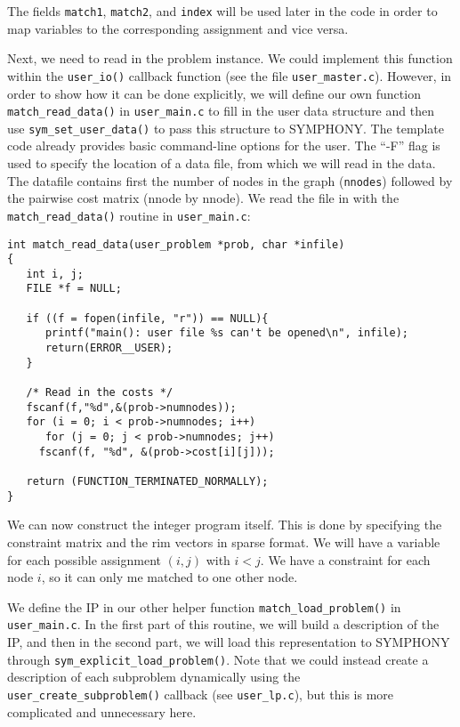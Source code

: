 \documentclass[11pt]{article}
\begin{document}
The fields \texttt{match1}, \texttt{match2}, and
\texttt{index} will be used later in the code in order to map variables to the
corresponding assignment and vice versa. 

Next, we need to read in the problem instance. We could implement this
function within the \texttt{user\_io()} callback function (see the file
\texttt{user\_master.c}). However, in order to show how it can be done
explicitly, we will define our own function \texttt{match\_read\_data()} in
\texttt{user\_main.c} to fill in the user data structure and then use
\texttt{sym\_set\_user\_data()} to pass this structure to SYMPHONY. The
template code already provides basic command-line options for the user. The
``-F'' flag is used to specify the location of a data file, from which we will
read in the data. The datafile contains first the number of nodes in the graph
(\texttt{nnodes}) followed by the pairwise cost matrix (nnode by nnode).  We
read the file in with the \texttt{match\_read\_data()} routine in
\texttt{user\_main.c}:


\begin{verbatim}
int match_read_data(user_problem *prob, char *infile)
{
   int i, j;
   FILE *f = NULL;

   if ((f = fopen(infile, "r")) == NULL){
      printf("main(): user file %s can't be opened\n", infile);
      return(ERROR__USER); 
   }

   /* Read in the costs */
   fscanf(f,"%d",&(prob->numnodes));
   for (i = 0; i < prob->numnodes; i++)
      for (j = 0; j < prob->numnodes; j++)
	 fscanf(f, "%d", &(prob->cost[i][j]));
   
   return (FUNCTION_TERMINATED_NORMALLY);
}
\end{verbatim}   

We can now construct the integer program itself. This is done by specifying
the constraint matrix and the rim vectors in sparse format. We will have a
variable for each possible assignment $(i,j)$ with $i<j$. We have a constraint
for each node $i$, so it can only me matched to one other node.

We define the IP in our other helper function \texttt{match\_load\_problem()}
in \texttt{user\_main.c}. In the first part of this routine, we will build a
description of the IP, and then in the second part, we will load this
representation to SYMPHONY through
\texttt{sym\_explicit\_load\_problem()}. Note that we could instead create a
description of each subproblem dynamically using the
\texttt{user\_create\_subproblem()} callback (see \texttt{user\_lp.c}), but
this is more complicated and unnecessary here.
\end{document}
